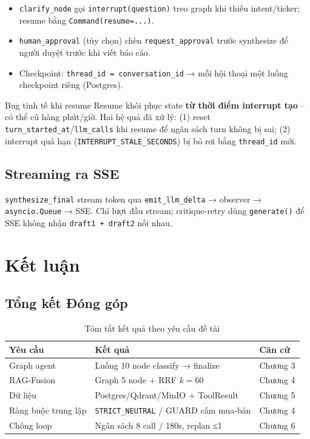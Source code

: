 \documentclass[12pt, a4paper]{report}
\begin{document}
\begin{itemize}
  \item \texttt{clarify\_node} gọi \texttt{interrupt(question)} treo graph khi thiếu intent/ticker; resume bằng \texttt{Command(resume=...)}.
  \item \texttt{human\_approval} (tùy chọn) chèn \texttt{request\_approval} trước synthesize để người duyệt trước khi viết báo cáo.
  \item Checkpoint: \texttt{thread\_id = conversation\_id} → mỗi hội thoại một luồng checkpoint riêng (Postgres).
\end{itemize}

\begin{warnbox}{Bug tinh tế khi resume}
Resume khôi phục state \textbf{từ thời điểm interrupt tạo} -- có thể cũ hàng phút/giờ. Hai hệ quả đã xử lý: (1) reset \texttt{turn\_started\_at}/\texttt{llm\_calls} khi resume để ngân sách turn không bị sai; (2) interrupt quá hạn (\texttt{INTERRUPT\_STALE\_SECONDS}) bị bỏ rơi bằng \texttt{thread\_id} mới.
\end{warnbox}

\section{Streaming ra SSE}

\texttt{synthesize\_final} stream token qua \texttt{emit\_llm\_delta} → observer → \texttt{asyncio.Queue} → SSE. Chỉ lượt đầu stream; critique-retry dùng \texttt{generate()} để SSE không nhận \texttt{draft1 + draft2} nối nhau.

\newpage

\chapter{Kết luận}

\section{Tổng kết Đóng góp}

\begin{table}[H]
\centering
\caption{Tóm tắt kết quả theo yêu cầu đề tài}
\small
\begin{tabularx}{\textwidth}{lXl}
\toprule
\textbf{Yêu cầu} & \textbf{Kết quả} & \textbf{Căn cứ} \\
\midrule
Graph agent & Luồng 10 node classify → finalize & Chương 3 \\
\rowcolor{rowgray}
RAG-Fusion & Graph 5 node + RRF $k=60$ & Chương 4 \\
Dữ liệu & Postgres/Qdrant/MinIO + ToolResult & Chương 5 \\
\rowcolor{rowgray}
Ràng buộc trung lập & \texttt{STRICT\_NEUTRAL} / GUARD cấm mua-bán & Chương 4 \\
Chống loop & Ngân sách 8 call / 180s, replan ≤1 & Chương 6 \\
\bottomrule
\end{tabularx}
\end{table}
\end{document}
